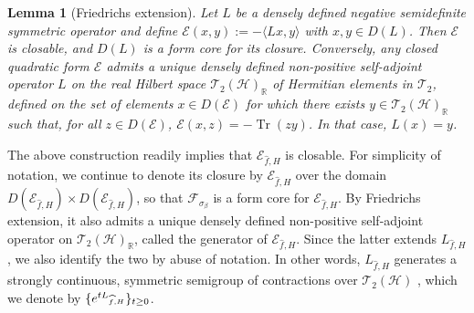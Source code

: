 \documentclass[11pt]{amsart}
\newcommand{\1}{\mathbbm{1}}
\newcommand{\Tr}{\operatorname{Tr}}
\newcommand{\cH}{\mathcal{H}}
\theoremstyle{plain}
\newtheorem{lemma}[theorem]{Lemma}
\theoremstyle{definition}
\theoremstyle{remark}
\numberwithin{equation}{section}
\begin{document}
\begin{lemma}[Friedrichs extension]\label{lem:Friedrichs}
Let $L$ be a densely defined negative semidefinite  symmetric operator and define $\mathcal{E}(x,y):=-\langle L x,y \rangle$ with $x,y \in D(L)$. Then $\mathcal{E}$ is closable, and $D(L)$ is a form core for its closure.
Conversely, any closed quadratic form $\mathcal{E}$ admits a unique densely defined non-positive self-adjoint operator $L$ on  the real Hilbert space $\mathscr{T}_2(\mathcal{H})_{\mathbb{R}}$ of Hermitian elements in $\mathscr{T}_2$, defined on the set of elements $x\in D(\mathcal{E})$ for which there exists $y\in \mathscr{T}_2(\mathcal{H})_{\mathbb{R}}$ such that, for all $ z\in D(\mathcal{E})$, $\mathcal{E}(x,z)=-\Tr(zy)$. In that case, $L(x)=y$. 
\end{lemma} 
\noindent The above construction readily implies that $\mathcal{E}_{\widehat{f},H}$ is closable. For simplicity of notation, we continue to denote its closure by $\mathcal{E}_{\widehat{f},H}$ over the domain $D(\mathcal{E}_{\widehat{f},H})\times D(\mathcal{E}_{\widehat{f},H})$, so that $\mathscr{F}_{\sigma_\beta}$ is a form core for $\mathcal{E}_{\widehat{f},H}$. By Friedrichs extension, it also admits a unique densely defined non-positive self-adjoint operator on $\mathscr{T}_2(\mathcal{H})_{\mathbb{R}}$, called the generator of $\mathcal{E}_{\widehat{f},H}$. Since the latter extends $L_{\widehat{f},H}$, we also identify the two by abuse of notation. In other words, $L_{\widehat{f},H}$ generates a strongly continuous, symmetric semigroup of contractions over $\mathscr{T}_2(\cH)$ \cite[Proposition 6.14]{Schmdgen2012}, which we denote by $\{e^{\smash{t L_{\widehat{f},H}}}\}_{t\ge 0}$.



\smallskip
\end{document}
